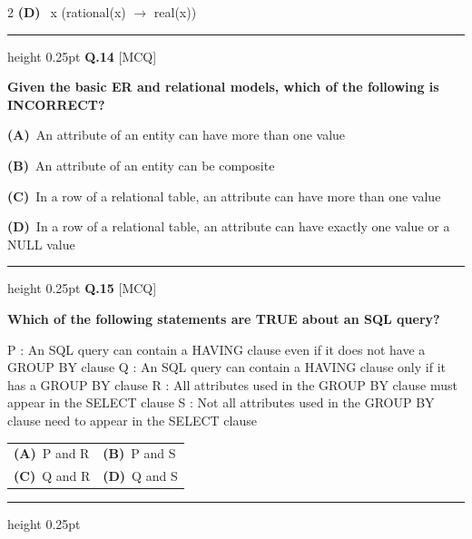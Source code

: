 \documentclass[a4paper,10pt,twoside]{article}
\begin{document}
\begin{multicols}{2}
\textbf{(D)}~x (rational(x) $\to$ real(x))
\par\vspace{6pt}\hrule height 0.25pt\vspace{6pt}
\noindent\textbf{Q.14} \hfill {\footnotesize\textsf{[MCQ]}}
\par\vspace{2pt}
{\bfseries Given the basic ER and relational models, which of the following is INCORRECT? \par}
\par\vspace{2pt}\noindent
\textbf{(A)}~An attribute of an entity can have more than one value\par\vspace{2pt}\noindent
\textbf{(B)}~An attribute of an entity can be composite\par\vspace{2pt}\noindent
\textbf{(C)}~In a row of a relational table, an attribute can have more than one value\par\vspace{2pt}\noindent
\textbf{(D)}~In a row of a relational table, an attribute can have exactly one value or a NULL value
\par\vspace{6pt}\hrule height 0.25pt\vspace{6pt}
\noindent\textbf{Q.15} \hfill {\footnotesize\textsf{[MCQ]}}
\par\vspace{2pt}
{\bfseries Which of the following statements are TRUE about an SQL query?
\par\smallskip
P : An SQL query can contain a HAVING clause even if it does not have a GROUP BY clause
Q : An SQL query can contain a HAVING clause only if it has a GROUP BY clause
R : All attributes used in the GROUP BY clause must appear in the SELECT clause
S : Not all attributes used in the GROUP BY clause need to appear in the SELECT clause \par}
\par\vspace{2pt}\noindent
\begin{tabular*}{\columnwidth}{@{\extracolsep{\fill}}p{}p{}@{}}
\textbf{(A)}~P and R & \textbf{(B)}~P and S \\
\addlinespace[2pt]
\textbf{(C)}~Q and R & \textbf{(D)}~Q and S
\end{tabular*}
\par\vspace{6pt}\hrule height 0.25pt\vspace{6pt}

\end{multicols}
\end{document}
